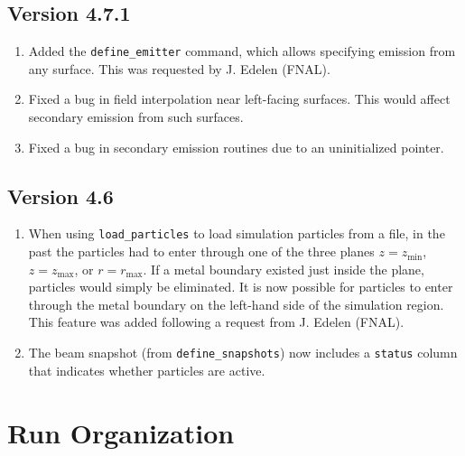 \documentclass[11pt]{article}
\begin{document}
\subsection{Version 4.7.1}
\begin{enumerate}
\item Added the \verb|define_emitter| command, which allows specifying emission from any
  surface. This was requested by J. Edelen (FNAL).
\item Fixed a bug in field interpolation near left-facing surfaces. This would affect secondary emission from such surfaces.
\item Fixed a bug in secondary emission routines due to an uninitialized pointer.
\end{enumerate}

\subsection{Version 4.6} 
\begin{enumerate}
\item When using \verb|load_particles| to load simulation particles from a file, in the past the
  particles had to enter through one of the three planes $z=z_{\textrm{min}}$, $z=z_{\textrm{max}}$, or
  $r=r_{\textrm{max}}$. If a metal boundary existed just inside the plane, particles would simply be
  eliminated. It is now possible for particles to enter through the metal boundary on the left-hand
  side of the simulation region. This feature was added following a request from J. Edelen (FNAL).
\item The beam snapshot (from \verb|define_snapshots|) now includes a \verb|status| column that
  indicates whether particles are active.
\end{enumerate}

\section{Run Organization}
\end{document}
